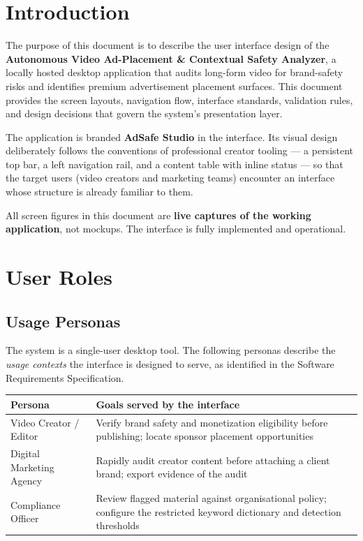 \documentclass[12pt,a4paper,twoside]{article}
\begin{document}
\tableofcontents
\newpage

\section{Introduction}

The purpose of this document is to describe the user interface design of the
\textbf{Autonomous Video Ad-Placement \& Contextual Safety Analyzer}, a locally hosted
desktop application that audits long-form video for brand-safety risks and identifies
premium advertisement placement surfaces. This document provides the screen layouts,
navigation flow, interface standards, validation rules, and design decisions that
govern the system's presentation layer.

The application is branded \textbf{AdSafe Studio} in the interface. Its visual design
deliberately follows the conventions of professional creator tooling --- a persistent
top bar, a left navigation rail, and a content table with inline status --- so that the
target users (video creators and marketing teams) encounter an interface whose
structure is already familiar to them.

All screen figures in this document are \textbf{live captures of the working
application}, not mockups. The interface is fully implemented and operational.

\section{User Roles}

\subsection{Usage Personas}

The system is a single-user desktop tool. The following personas describe the
\emph{usage contexts} the interface is designed to serve, as identified in the Software
Requirements Specification.

\begin{table}[htbp]
\centering
\begin{tabular}{|p{4cm}|p{8cm}|}
\hline
\textbf{Persona} & \textbf{Goals served by the interface}\\
\hline
Video Creator / Editor & Verify brand safety and monetization eligibility before
publishing; locate sponsor placement opportunities\\
\hline
Digital Marketing Agency & Rapidly audit creator content before attaching a client
brand; export evidence of the audit\\
\hline
Compliance Officer & Review flagged material against organisational policy; configure
the restricted keyword dictionary and detection thresholds\\
\hline
\end{tabular}
\end{table}
\end{document}

